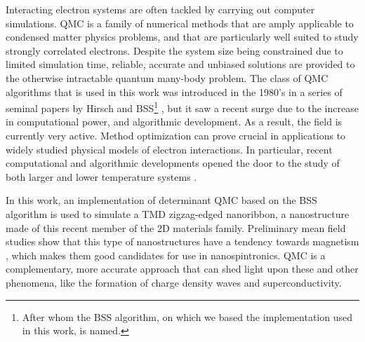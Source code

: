 Interacting electron systems are often tackled by carrying out computer simulations.
\ac{QMC} is a family of numerical methods that are  amply applicable to condensed matter physics problems, and that are particularly well suited to study strongly correlated electrons.
Despite the system size being constrained due to limited simulation time, reliable, accurate and unbiased solutions are provided to the otherwise intractable quantum many-body problem.
The class of \acs{QMC} algorithms that is used in this work was introduced in the 1980's in a series of seminal papers by Hirsch and \acl{BSS}\footnote{After whom the \ac{BSS} algorithm, on which we based the implementation used in this work, is named.} \cite{hirsch_discrete_1983, hirsch_monte_1982, blankenbecler_monte_1981, hirsch_two-dimensional_1985, hirsch_monte_1983, hirsch_stable_1988, hirsch_antiferromagnetism_1989}, but it saw a recent surge \cite{dumitrescu_superconductivity_2016, berg_monte_2018, beyl_revisiting_2018, chang_recent_2015, esterlis_breakdown_2018, mondaini_determinant_2012, meng_characterization_2014, kung_characterizing_2016, johnston_determinant_2013, rademaker_determinant_2013, ying_determinant_2014, scalettar_numerical_2007, zhou_quantum_2014} due to the increase in computational power, and algorithmic development.
As a result, the field is currently very active. 
Method optimization can prove crucial in applications to widely studied physical models of electron interactions.
In particular, recent computational and algorithmic developments opened the door to the study of both larger and lower temperature systems \cite{jiang_fast_2016, lee_parallelization_2010, chang_recent_2015, bai_stable_2011}.

In this work, an implementation of determinant \acs{QMC} based on the \ac{BSS} algorithm is used to simulate a \ac{TMD} zigzag-edged nanoribbon, a nanostructure made of this recent member of the \acs{2D} materials family.
Preliminary mean field studies show that this type of nanostructures have a tendency towards magnetism \cite{yazyev_emergence_2010}, which makes them good candidates for use in nanospintronics.
\acs{QMC} is a complementary, more accurate approach that can shed light upon these and other phenomena, like the formation of charge density waves and superconductivity.